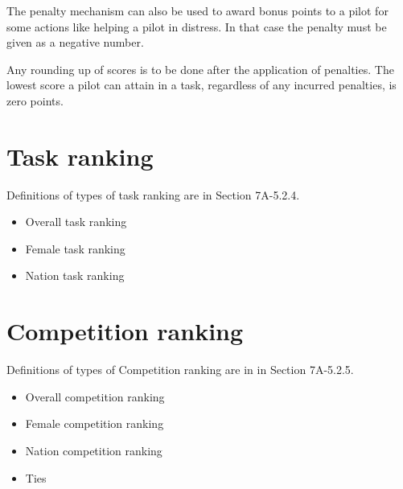 \documentclass{article}
\begin{document}
The penalty mechanism can also be used to award bonus points to a pilot for
some actions like helping a pilot in distress. In that case the penalty must be
given as a negative number.

Any rounding up of scores is to be done after the application of penalties. The
lowest score a pilot can attain in a task, regardless of any incurred
penalties, is zero points.

\newpage
\section{Task ranking}
\label{sec:task-ranking}
Definitions of types of task ranking are in Section 7A-5.2.4.
\begin{itemize}
    \item Overall task ranking
    \item Female task ranking
    \item Nation task ranking
\end{itemize}

\newpage
\section{Competition ranking}
\label{sec:competition-ranking}
\label{sec:overall-competition-ranking}
Definitions of types of Competition ranking are in in Section 7A-5.2.5.
\begin{itemize}
    \item Overall competition ranking
    \item Female competition ranking
    \item Nation competition ranking
    \item Ties
\end{itemize}

\newpage
\end{document}
